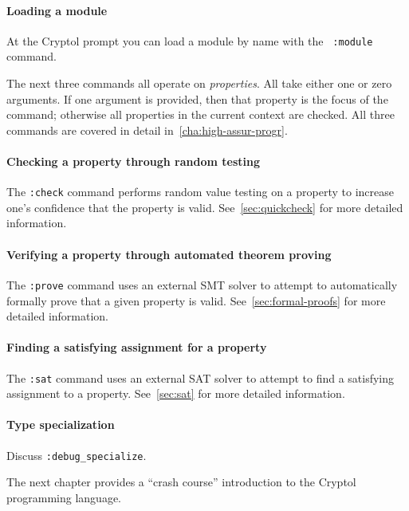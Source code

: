 \paragraph*{Loading a module}
At the Cryptol prompt you can load a module by name with the {\tt
  :module} command.\indCmdLoadModule

The next three commands all operate on \emph{properties}.  All take
either one or zero arguments.  If one argument is provided, then that
property is the focus of the command; otherwise all properties in the
current context are checked.  All three commands are covered in detail
in~\autoref{cha:high-assur-progr}.

\paragraph*{Checking a property through random testing}
The \texttt{:check} command performs random value testing on a
property to increase one's confidence that the property is valid.
See~\autoref{sec:quickcheck} for more detailed information.

\paragraph*{Verifying a property through automated theorem proving}
The \texttt{:prove} command uses an external SMT solver to attempt to
automatically formally prove that a given property is valid.
See~\autoref{sec:formal-proofs} for more detailed information.

\paragraph*{Finding a satisfying assignment for a property}
The \texttt{:sat} command uses an external SAT solver to attempt to
find a satisfying assignment to a property.  See~\autoref{sec:sat} for
more detailed information.

\paragraph*{Type specialization}
Discuss \texttt{:debug\_specialize}.  

\vspace{2cm}

The next chapter provides a ``crash course'' introduction to the
Cryptol programming language.



